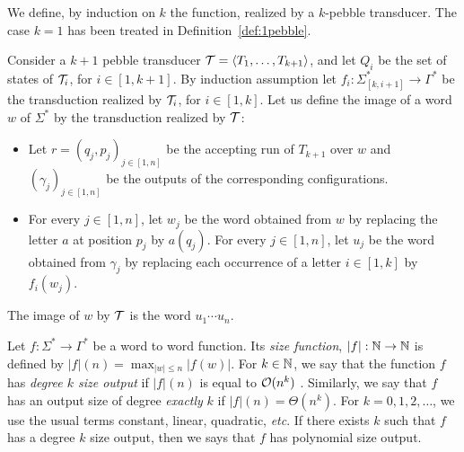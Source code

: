   \begin{definition}
We define, by induction on $k$ the function, realized by a $k$-pebble transducer. The case $k=1$ has been treated in Definition~\ref{def:1pebble}. 

Consider a $k+1$ pebble transducer ${\mathcal T}=\langle T_1,\ldots,T_{k+1} \rangle$, and let $Q_i$ be the set of states of ${\mathcal T}_i$, for $i\in [1,k+1]$. By induction assumption let $f_i:\Sigma_{[k,i+1]}^*\rightarrow \Gamma^*$ be the transduction realized by ${\mathcal T}_i$, for $i\in [1,k]$.
Let us define the image of a word $w$ of $\Sigma^*$ by the transduction realized by ${\mathcal T}$:
\begin{itemize}
  \item Let $r=(q_j,p_j)_{j\in[1, n]}$ be the accepting run of $T_{k+1}$ over $w$ and $(\gamma_j)_{j\in[1, n]}$ be the outputs of the corresponding configurations.
  
  \item  For every $j\in[1,n]$, let $w_j$ be the word obtained from $w$ by replacing the letter $a$ at position $p_j$ by $a(q_j)$.
      For every $j\in[1,n]$, let $u_j$ be the word obtained from $\gamma_j$ by replacing each occurrence of a letter $i\in [1,k]$ by $f_i(w_j)$.
  
  \end{itemize}
  The image of $w$ by ${\mathcal T}$ is the word $u_1\cdots u_n$.
\end{definition}


\begin{definition}
  Let $f:\Sigma^*\rightarrow \Gamma^*$ be a word to word function. Its \emph{size function}, $|f|:\mathbb{N}\rightarrow \mathbb{N}$ is defined by $|f|(n)=\max_{|w|\leq n}|f(w)|$. For $k\in \mathbb{N}$, we say that the function $f$ has \emph{degree $k$ size output} if $|f|(n)$ is equal to ${\mathcal O}(n^k)$ . Similarly, we say that $f$ has an output size of degree \emph{exactly} $k$ if $|f|(n)=\Theta(n^k)$. For $k=0,1,2,\ldots$, we use the usual terms constant, linear, quadratic, \textit{etc}.
  If there exists $k$ such that $f$ has a degree $k$ size output, then we says that $f$ has polynomial size output.
  
\end{definition}

